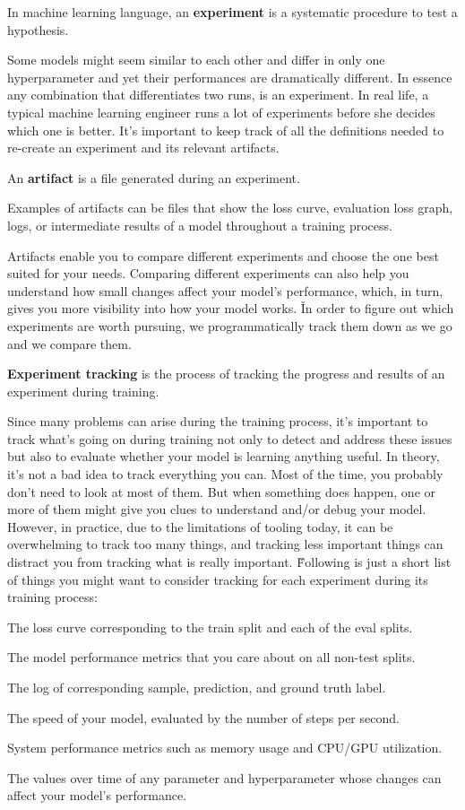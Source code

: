 \bd[Experiment]
In machine learning language, an \textbf{experiment} is a systematic procedure to test a hypothesis.
\ed

Some models might seem similar to each other and differ in only one hyperparameter and yet their performances are
dramatically different. In essence any combination that differentiates two runs, is an experiment. In real life, a
typical machine learning engineer runs a lot of experiments before she decides which one is better. It's important to
keep track of all the definitions needed to re-create an experiment and its relevant artifacts.

\bd[Artifact]
An \textbf{artifact} is a file generated during an experiment.
\ed

\be
Examples of artifacts can be files that show the loss curve, evaluation loss graph, logs, or intermediate results of a
model throughout a training process.
\ee

Artifacts enable you to compare different experiments and choose the one best suited for your needs. Comparing
different experiments can also help you understand how small changes affect your model's performance, which, in turn,
gives you more visibility into how your model works. \v

In order to figure out which experiments are worth pursuing, we programmatically track them down as we go and we compare
them.

\textbf{Experiment tracking} is the process of tracking the progress and results of an experiment during training.
\ed

Since many problems can arise during the training process, it's important to track what's going on during training not
only to detect and address these issues but also to evaluate whether your model is learning anything useful. In theory,
it's not a bad idea to track everything you can. Most of the time, you probably don't need to look at most of them. But
when something does happen, one or more of them might give you clues to understand and/or debug your model. However,
in practice, due to the limitations of tooling today, it can be overwhelming to track too many things, and tracking
less important things can distract you from tracking what is really important. \v

Following is just a short list of things you might want to consider tracking for each experiment during its training
process:
\bit
\item The loss curve corresponding to the train split and each of the eval splits.
\item The model performance metrics that you care about on all non-test splits.
\item The log of corresponding sample, prediction, and ground truth label.
\item The speed of your model, evaluated by the number of steps per second.
\item System performance metrics such as memory usage and CPU/GPU utilization.
\item The values over time of any parameter and hyperparameter whose changes can affect your model's performance.
\eit

